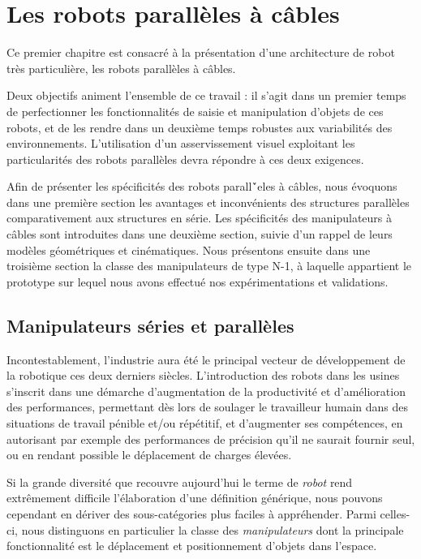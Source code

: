 \chapter{Les robots parall\`eles \`a c\^ables} \label{chap0}

Ce premier chapitre est consacré à la présentation d'une architecture de robot 
très particulière, les robots parall\`eles \`a c\^ables.

Deux objectifs animent l'ensemble de ce travail : il s'agit dans un premier 
temps de perfectionner les fonctionnalités de saisie et manipulation d'objets de 
ces robots, et de les rendre dans un deuxi\`eme temps robustes aux 
variabilit\'es des environnements. L'utilisation d'un asservissement visuel 
exploitant les particularit\'es des robots parall\`eles devra r\'epondre \`a ces 
deux exigences.

Afin de pr\'esenter les sp\'ecificit\'es des robots parall\'`eles \`a c\^ables, 
nous  évoquons dans une première section les avantages et inconvénients des 
structures parallèles comparativement aux structures en série. Les spécificités 
des manipulateurs à c\^ables sont introduites dans une deuxième section, suivie 
d'un rappel de leurs modèles géométriques et cinématiques. Nous présentons 
ensuite dans une troisième section la classe des manipulateurs de type N-1, \`a 
laquelle appartient le prototype sur lequel nous avons effectu\'e nos 
expérimentations et validations.

\section{Manipulateurs séries et parallèles} \label{chap0-0}

Incontestablement, l'industrie aura été le principal vecteur de développe\-ment 
de la robotique ces deux derniers siècles. L'introduction des robots dans les 
usines s'inscrit dans une démarche d'augmentation de la productivité et 
d'amélio\-ration des performances, permettant dès lors de soulager le 
travailleur humain dans des situations de travail pénible et/ou répétitif, et 
d'augmenter ses compétences, en autorisant par exemple des performances de 
précision qu'il ne saurait fournir seul, ou en rendant possible le déplacement 
de charges élevées.

Si la grande diversité que recouvre aujourd'hui le terme de {\it robot} rend 
extrê\-mement difficile l'élaboration d'une définition générique, nous pouvons 
cependant en dériver des sous-catégories plus faciles à appréhender. Parmi 
celles-ci, nous distinguons en particulier la classe des {\it manipulateurs} 
dont la principale fonctionnalité est le déplacement et positionnement d'objets 
dans l'espace.

